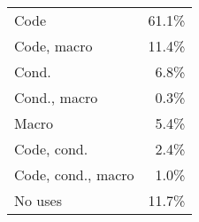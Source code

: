 \begin{tabular}{|lr|}\hline
Code & 61.1\% \\
Code, macro & 11.4\% \\ \hline
Cond. & \phantom{0}6.8\% \\
Cond., macro & \phantom{0}0.3\% \\ \hline
Macro & \phantom{0}5.4\% \\ \hline
Code, cond. & \phantom{0}2.4\% \\
Code, cond., macro & \phantom{0}1.0\% \\ \hline
No uses & 11.7\% \\ \hline
\end{tabular}

